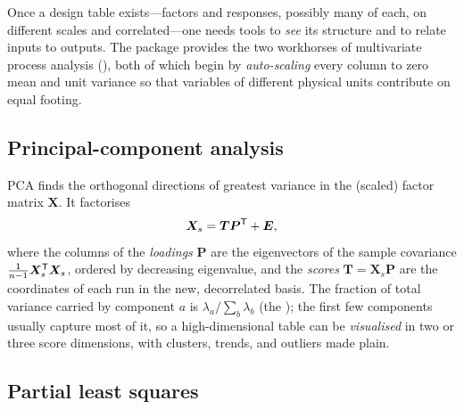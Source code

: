 Once a design table exists---factors and responses, possibly many of each, on
different scales and correlated---one needs tools to \emph{see} its structure and
to relate inputs to outputs. The package provides the two workhorses of
multivariate process analysis (), both of which begin by
\emph{auto-scaling} every column to zero mean and unit variance so that variables
of different physical units contribute on equal footing.

\subsection{Principal-component analysis}

PCA finds the orthogonal directions of greatest variance in the (scaled) factor
matrix $\bm X$. It factorises
%
\begin{equation}
\bm X_s = \bm T \bm P^{\mathsf{T}} + \bm E,
\end{equation}
%
where the columns of the \emph{loadings} $\bm P$ are the eigenvectors of the
sample covariance $\tfrac{1}{n-1}\bm X_s^{\mathsf{T}}\bm X_s$, ordered by decreasing
eigenvalue, and the \emph{scores} $\bm T = \bm X_s\bm P$ are the coordinates of
each run in the new, decorrelated basis. The fraction of total variance carried
by component $a$ is $\lambda_a / \sum_b \lambda_b$ (the
); the first few components usually capture most
of it, so a high-dimensional table can be \emph{visualised} in two or three score
dimensions, with clusters, trends, and outliers made plain.

\subsection{Partial least squares}

